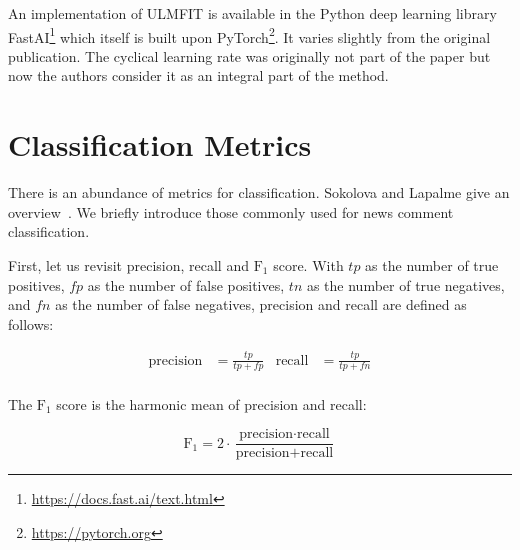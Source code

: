 An implementation of ULMFIT is available in the Python deep learning library FastAI\footnote{\url{https://docs.fast.ai/text.html}} which itself is built upon PyTorch\footnote{\url{https://pytorch.org}}. It varies slightly from the original publication. The cyclical learning rate was originally not part of the paper but now the authors consider it as an integral part of the method.


\section{Classification Metrics}
\label{sec:metrics}

There is an abundance of metrics for classification. Sokolova and Lapalme give an overview~\cite{Sokolova:2009:SAP:1542545.1542682}. We briefly introduce those commonly used for news comment classification.

First, let us revisit precision, recall and $\text{F}_{1}$ score. With $tp$ as the number of true positives, $fp$ as the number of false positives, $tn$ as the number of true negatives, and $fn$ as the number of false negatives, precision and recall are defined as follows:

\begin{align*}
 \text{precision} &= \frac{tp}{tp+fp} & \text{recall} &= \frac{tp}{tp+fn} \\
\end{align*}

\newpage
The $\text{F}_{1}$ score is the harmonic mean of precision and recall:

\begin{equation*}
    \text{F}_{1} = 2 \cdot \frac{\text{precision} \cdot \text{recall}}{\text{precision} + \text{recall}}
\end{equation*}


